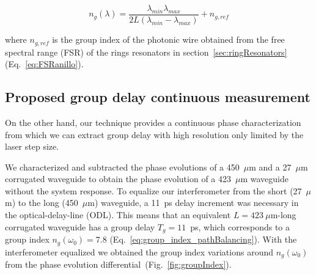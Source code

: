 \documentclass[journal]{IEEEtran}
\begin{document}


\begin{equation}
  n_g (\lambda)=\frac{\lambda_{min} \lambda_{max}}{ 2L (\lambda_{min} - \lambda_{max})} + n_{g,ref}
\end{equation}


where $n_{g,ref}$ is the group index of the photonic wire obtained from the free spectral range (FSR) of the rings resonators in section~\ref{sec:ringResonators} (Eq.~\ref{eq:FSRanillo}).  %





\subsection{Proposed group delay continuous measurement}
\label{sec:newTechnique}
On the other hand, our technique provides a continuous phase characterization from which we can extract group delay with high resolution only limited by the laser step size.

We characterized and subtracted the phase evolutions of a 450~$\mu$m and a 27~$\mu$m corrugated waveguide to obtain the phase evolution of a 423~$\mu$m waveguide without the system response. To equalize our interferometer from the short (27~$\mu$m) to the long (450~$\mu$m) waveguide, a 11~ps delay increment was necessary in the optical-delay-line (ODL). This means that an equivalent $L=423~\mu$m-long corrugated waveguide has a group delay $T_g=11$~ps, which corresponds to a group index $n_g(\omega_0)=7.8$ (Eq.~\ref{eq:group_index_pathBalancing}). With the interferometer equalized we obtained the group index variations around $n_g(\omega_0)$ from the phase evolution differential~(Fig.~\ref{fig:groupIndex}).
\end{document}
